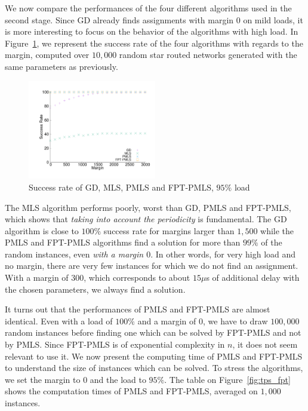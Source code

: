 \documentclass[10pt, conference, letterpaper]{IEEEtran}
\begin{document}
      We now compare the performances of the four different algorithms used in the second stage. Since GD already finds assignments with margin $0$ on mild loads, it is more interesting to focus on the behavior of the algorithms with high load. In Figure~\ref{fig:success21000}, we represent the success rate of the four algorithms with regards to the margin,  computed over $10,000$ random star routed networks generated with the same parameters as previously. 
     
    \begin{figure} [h] 
       \begin{center}
      \includegraphics[width=0.5\textwidth]{retour_21000.pdf}
      \end{center}
      \caption{Success rate of GD, MLS, PMLS and FPT-PMLS, $95\%$ load}
     \label{fig:success21000}
     \end{figure}
     
      The MLS algorithm performs poorly, worst than GD, PMLS and FPT-PMLS, which shows that \emph{taking into account the periodicity} is fundamental.
     The GD algorithm is close to $100\%$ success rate for margins larger than $1,500$ while the PMLS and FPT-PMLS algorithms find a solution for more than $99\%$ of the random instances, even \emph{with a margin $0$}. In other words, for very high load and no margin, there are very few instances for which we do not find an assignment. With a margin of $300$, which corresponds to about $15\mu$s of additional delay with the chosen parameters, we always find a solution. 
     
     It turns out that the performances of PMLS and FPT-PMLS 
     are almost identical. Even with a load of $100\%$ and a margin of $0$, we have to draw $100,000$ random instances before finding one which can be solved by FPT-PMLS and not by PMLS. Since FPT-PMLS is of exponential complexity in $n$, it does not seem relevant to use it. We now present the computing time of PMLS and FPT-PMLS to understand the size of instances which can be solved. To stress the algorithms, we set the margin to $0$ and the load to $95\%$. The table on Figure~\ref{fig:tps_fpt} shows the computation times of PMLS and  FPT-PMLS, averaged on $1,000$ instances. 
     
\end{document}
